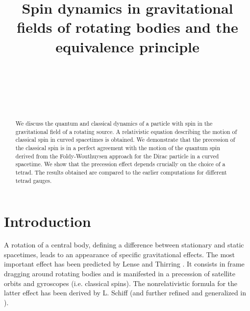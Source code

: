 \documentclass[preprint,showpacs,preprintnumbers,amsmath,amssymb]{revtex4}
\begin{document}

\title{Spin dynamics in gravitational fields
of rotating bodies and the equivalence principle}

\author{~}
 

\author{~}
 

\author{~}
 

\begin{abstract}
We discuss the quantum and classical dynamics of a particle with spin
in the gravitational field of a rotating source. A relativistic equation
describing the motion of classical spin in curved spacetimes is obtained.
We demonstrate that the precession of the classical spin is in a perfect
agreement with the motion of the quantum spin derived from the Foldy-Wouthuysen
approach for the Dirac particle in a curved spacetime. We show that the
precession effect depends crucially on the choice of a tetrad. The results
obtained are compared to the earlier computations for different tetrad
gauges.
\end{abstract}

\maketitle

\section{Introduction}

A rotation of a central body, defining a difference between
stationary and static spacetimes, leads to an appearance of
specific gravitational effects. The most important effect has been
predicted by Lense and Thirring \cite{LT}. It consists in frame
dragging around rotating bodies and is manifested in a precession of
satellite orbits and gyroscopes (i.e. classical spins). The
nonrelativistic formula for the latter effect has been derived by
L. Schiff \cite{Schiff} (and further refined and generalized in
\cite{Shiff2}).
\end{document}
